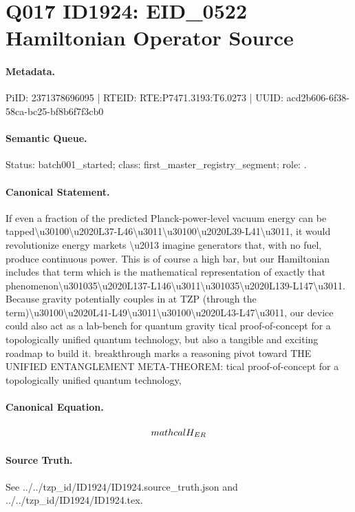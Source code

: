 \section*{Q017 ID1924: EID\_0522 Hamiltonian Operator Source}
\paragraph{Metadata.}
PiID: 2371378696095 | RTEID: RTE:P7471.3193:T6.0273 | UUID: acd2b606-6f38-58ca-bc25-bf8b6f7f3cb0

\paragraph{Semantic Queue.}
Status: batch001\_started; class: first\_master\_registry\_segment; role: .

\paragraph{Canonical Statement.}
If even a fraction of the predicted Planck-power-level vacuum energy can be tapped\textbackslash{}u30100\textbackslash{}u2020L37-L46\textbackslash{}u3011\textbackslash{}u30100\textbackslash{}u2020L39-L41\textbackslash{}u3011, it would revolutionize energy markets \textbackslash{}u2013 imagine generators that, with no fuel, produce continuous power. This is of course a high bar, but our Hamiltonian includes that term which is the mathematical representation of exactly that phenomenon\textbackslash{}u301035\textbackslash{}u2020L137-L146\textbackslash{}u3011\textbackslash{}u301035\textbackslash{}u2020L139-L147\textbackslash{}u3011. Because gravity potentially couples in at TZP (through the term)\textbackslash{}u30100\textbackslash{}u2020L41-L49\textbackslash{}u3011\textbackslash{}u30100\textbackslash{}u2020L43-L47\textbackslash{}u3011, our device could also act as a lab-bench for quantum gravity tical proof-of-concept for a topologically unified quantum technology, but also a tangible and exciting roadmap to build it. breakthrough marks a reasoning pivot toward THE UNIFIED ENTANGLEMENT META-THEOREM: tical proof-of-concept for a topologically unified quantum technology,

\paragraph{Canonical Equation.}
\[
\\mathcal{H}_{ER}
\]

\paragraph{Source Truth.}
See ../../tzp\_id/ID1924/ID1924.source\_truth.json and ../../tzp\_id/ID1924/ID1924.tex.
